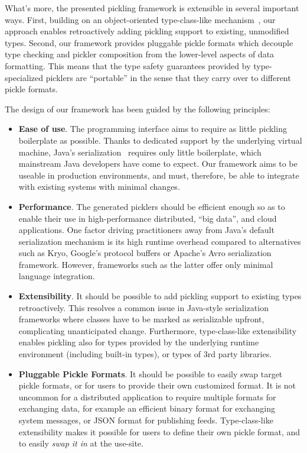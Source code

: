 \documentclass[preprint,10pt]{sigplanconf}
\begin{document}
What's more, the presented pickling framework is extensible in several
important ways. First, building on an object-oriented type-class-like
mechanism~\cite{Oliveira2010}, our approach enables retroactively adding
pickling support to existing, unmodified types. Second, our framework provides
pluggable pickle formats which decouple type checking and pickler composition
from the lower-level aspects of data formatting. This means that the type
safety guarantees provided by type-specialized picklers are ``portable'' in
the sense that they carry over to different pickle formats.

The design of our framework has been guided by the following principles:

\begin{itemize}
\item {\bf Ease of use}. The programming interface aims to require as little
pickling boilerplate as possible. Thanks to dedicated support by the
underlying virtual machine, Java's serialization~\cite{JavaSerialization}
requires only little boilerplate, which mainstream Java developers have come
to expect. Our framework aims to be useable in production environments, and
must, therefore, be able to integrate with existing systems with minimal
changes.

\item {\bf Performance}. The generated picklers should be efficient enough  so
as to enable their use in high-performance distributed, ``big data'', and
cloud applications. One factor driving practitioners away from Java's default
serialization mechanism is its high runtime overhead compared to alternatives
such as Kryo, Google's protocol buffers or Apache's Avro serialization
framework. However, frameworks such as the latter offer only minimal language
integration.

\item {\bf Extensibility}. It should be possible to add pickling support to existing
types retroactively. This resolves a common issue in Java-style serialization
frameworks where classes have to be marked as serializable upfront,
complicating unanticipated change. Furthermore, type-class-like extensibility
enables pickling also for types provided by the underlying runtime environment
(including built-in types), or types of 3rd party libraries.

\item {\bf Pluggable Pickle Formats}. It should be possible to easily swap target
pickle formats, or for users to provide their own customized format. It is not
uncommon for a distributed application to require multiple formats for
exchanging data, for example an efficient binary format for exchanging system
messages, or JSON format for publishing feeds. Type-class-like extensibility
makes it possible for users to define their own pickle format, and to easily
{\em swap it in} at the use-site.


\end{itemize}
\end{document}
